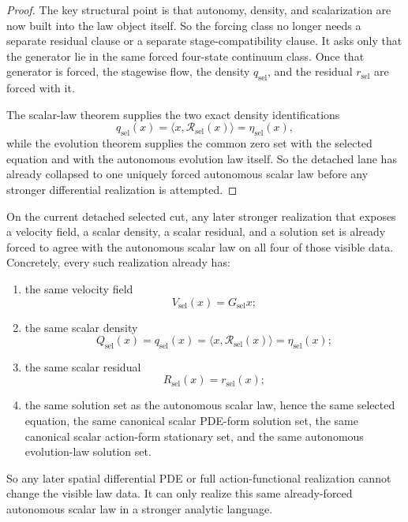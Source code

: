 \begin{proof}
The key structural point is that autonomy, density, and scalarization are now
built into the law object itself. So the forcing class no longer needs a
separate residual clause or a separate stage-compatibility clause. It asks
only that the generator lie in the same forced four-state continuum class.
Once that generator is forced, the stagewise flow, the density
\(q_{\mathrm{sel}}\), and the residual \(r_{\mathrm{sel}}\) are forced with
it.

The scalar-law theorem supplies the two exact density identifications
\[
q_{\mathrm{sel}}(x)
 =\langle x,\mathcal R_{\mathrm{sel}}(x)\rangle
 =\eta_{\mathrm{sel}}(x),
\]
while the evolution theorem supplies the common zero set with the selected
equation and with the autonomous evolution law itself. So the detached lane
has already collapsed to one uniquely forced autonomous scalar law before any
stronger differential realization is attempted.
\end{proof}

\begin{theorem}
\label{thm:the-selected-cut-already-fixes-the-public-contract-for-any-later-stronger-flagship-realization}
On the current detached selected cut, any later stronger realization
that exposes a velocity field, a scalar density, a scalar residual, and a
solution set is already forced to agree with the autonomous scalar law on all
four of those visible data. Concretely, every such realization already has:
\begin{enumerate}
\item the same velocity field
\[
V_{\mathrm{sel}}(x)=G_{\mathrm{sel}}x;
\]
\item the same scalar density
\[
Q_{\mathrm{sel}}(x)
 =q_{\mathrm{sel}}(x)
 =\langle x,\mathcal R_{\mathrm{sel}}(x)\rangle
 =\eta_{\mathrm{sel}}(x);
\]
\item the same scalar residual
\[
R_{\mathrm{sel}}(x)=r_{\mathrm{sel}}(x);
\]
\item the same solution set as the autonomous scalar law, hence the same
      selected equation, the same canonical scalar PDE-form solution set, the
      same canonical scalar action-form stationary set, and the same
      autonomous evolution-law solution set.
\end{enumerate}
So any later spatial differential PDE or full action-functional realization
cannot change the visible law data. It can only realize this same already-forced
autonomous scalar law in a stronger analytic language.
\end{theorem}

